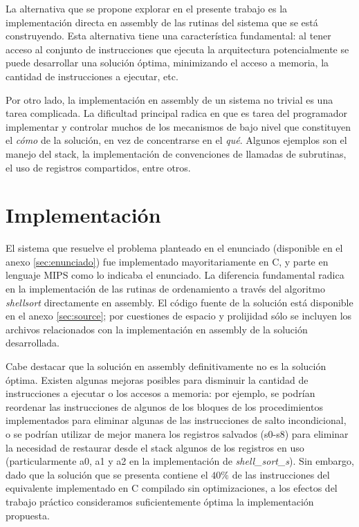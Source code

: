 \documentclass[a4paper,11pt]{article}
\begin{document}
La alternativa que se propone explorar en el presente trabajo es la
implementación directa en assembly de las rutinas del sistema que se está
construyendo. Esta alternativa tiene una característica fundamental: al tener
acceso al conjunto de instrucciones que ejecuta la arquitectura potencialmente
se puede desarrollar una solución óptima, minimizando el acceso a memoria, la
cantidad de instrucciones a ejecutar, etc.

Por otro lado, la implementación en assembly de un sistema no trivial es una
tarea complicada. La dificultad principal radica en que es tarea del
programador implementar y controlar muchos de los mecanismos de bajo nivel que
constituyen el \textit{cómo} de la solución, en vez de concentrarse en el
\textit{qué}. Algunos ejemplos son el manejo del stack, la implementación de
convenciones de llamadas de subrutinas, el uso de registros compartidos, entre
otros.

\section{Implementación}

El sistema que resuelve el problema planteado en el enunciado (disponible en el
anexo \ref{sec:enunciado}) fue implementado mayoritariamente en C, y parte en 
lenguaje MIPS como lo indicaba el enunciado. La diferencia fundamental radica 
en la implementación de las rutinas de ordenamiento a través del algoritmo 
\textit{shellsort} directamente en assembly. El código fuente de
la solución está disponible en el anexo \ref{sec:source}; por cuestiones de
espacio y prolijidad sólo se incluyen los archivos relacionados con la
implementación en assembly de la solución desarrollada.

Cabe destacar que la solución en assembly definitivamente no es la solución
óptima. Existen algunas mejoras posibles para disminuir la cantidad de
instrucciones a ejecutar o los accesos a memoria: por ejemplo, se podrían
reordenar las instrucciones de algunos de los bloques de los procedimientos
implementados para eliminar algunas de las instrucciones de salto
incondicional, o se podrían utilizar de mejor manera los registros salvados
(s0-s8) para eliminar la necesidad de restaurar desde el stack algunos de los
registros en uso (particularmente a0, a1 y a2 en la implementación de
\textit{shell\_sort\_s}). Sin embargo, dado que la solución que se presenta
contiene el \(40\%\) de las instrucciones del equivalente implementado en C
compilado sin optimizaciones, a los efectos del trabajo práctico consideramos
suficientemente óptima la implementación propuesta.
\end{document}
